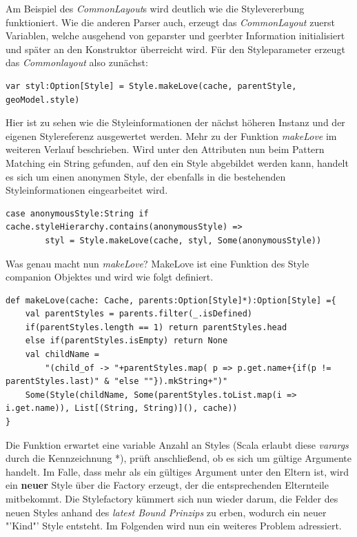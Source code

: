 Am Beispiel des \textit{CommonLayout}s wird deutlich wie die Stylevererbung funktioniert.
Wie die anderen Parser auch, erzeugt das \textit{CommonLayout} zuerst Variablen, welche ausgehend von geparster und geerbter Information initialisiert und später an den Konstruktor überreicht wird. Für den Styleparameter erzeugt das \textit{Commonlayout} also zunächst:
\begin{lstlisting}[style=scala]
var styl:Option[Style] = Style.makeLove(cache, parentStyle, geoModel.style)
\end{lstlisting}
Hier ist zu sehen wie die Styleinformationen der nächst höheren Instanz und der eigenen Stylereferenz ausgewertet werden. Mehr zu der Funktion \textit{makeLove} im weiteren Verlauf beschrieben. Wird unter den Attributen nun beim Pattern Matching ein String gefunden, auf den ein Style abgebildet werden kann, handelt es sich um einen anonymen Style, der ebenfalls in die bestehenden Styleinformationen eingearbeitet wird.
\begin{lstlisting}[style=scala]
case anonymousStyle:String if cache.styleHierarchy.contains(anonymousStyle) =>
        styl = Style.makeLove(cache, styl, Some(anonymousStyle))
\end{lstlisting}Was genau macht nun \textit{makeLove}?
MakeLove ist eine Funktion des Style companion Objektes und wird wie folgt definiert.
\begin{lstlisting}[style=scala]
def makeLove(cache: Cache, parents:Option[Style]*):Option[Style] ={
    val parentStyles = parents.filter(_.isDefined)
    if(parentStyles.length == 1) return parentStyles.head
    else if(parentStyles.isEmpty) return None
    val childName =
        "(child_of -> "+parentStyles.map( p => p.get.name+{if(p != parentStyles.last)" & "else ""}).mkString+")"
    Some(Style(childName, Some(parentStyles.toList.map(i => i.get.name)), List[(String, String)](), cache))
}
\end{lstlisting}Die Funktion erwartet eine variable Anzahl an Styles (Scala erlaubt diese \textit{varargs} durch die Kennzeichnung *), prüft anschließend, ob es sich um gültige Argumente handelt. Im Falle, dass mehr als ein gültiges Argument unter den Eltern ist, wird ein \textbf{neuer} Style über die Factory erzeugt, der die entsprechenden Elternteile mitbekommt. Die Stylefactory kümmert sich nun wieder darum, die Felder des neuen Styles anhand des \textit{latest Bound Prinzips} zu erben, wodurch ein neuer "'Kind"' Style entsteht.\linebreak
Im Folgenden wird nun ein weiteres Problem adressiert.
